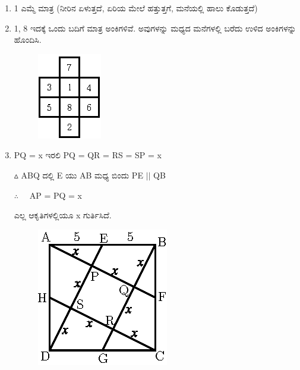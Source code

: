 \begin{enumerate}
\item 1 ಎಮ್ಮೆ ಮಾತ್ರ (ನೀರಿನ ಏಳುತ್ತದೆ, ಏರಿಯ ಮೇಲೆ ಹತ್ತುತ್ತಗೆ, ಮನೆಯಲ್ಲಿ ಹಾಲು ಕೊಡುತ್ತದೆ)

\item 1, 8 ಇದಕ್ಕೆ ಒಂದು ಬದಿಗೆ ಮಾತ್ರ ಅಂಕಿಗಳಿವೆ. ಅವುಗಳನ್ನು ಮಧ್ಯದ ಮನೆಗಳಲ್ಲಿ ಬರೆದು ಉಳಿದ ಅಂಕಿಗಳನ್ನು ಹೊಂದಿಸಿ. 

\begin{figure}[H]
\centering
\includegraphics[scale=1.1]{images/chap3/ans28.eps}
\end{figure}

\item PQ = x ಇರಲಿ  PQ = QR = RS = SP = x

$\vartriangle$ ABQ ದಲ್ಲಿ  E ಯು AB ಮಧ್ಯ ಬಿಂದು PE $||$  QB

$\therefore\quad$ AP = PQ = x

ಎಲ್ಲ ಆಕೃತಿಗಳಲ್ಲಿಯೂ x ಗುರ್ತಿಸಿದೆ.  
\begin{figure}[H]
\centering
\includegraphics[scale=1.5]{images/chap3/ans29.eps}
\end{figure}


\end{enumerate}
